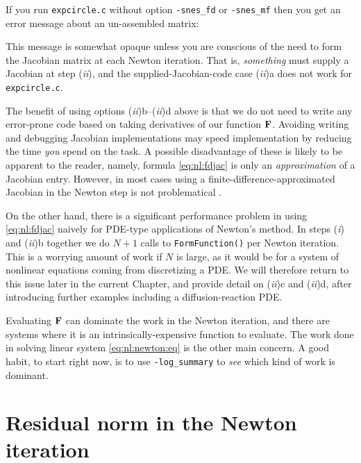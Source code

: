 If you run \texttt{expcircle.c} without option \texttt{-snes\_fd} or \texttt{-snes\_mf} then you get an error message about an un-assembled matrix:
This message is somewhat opaque unless you are conscious of the need to form the Jacobian matrix at each Newton iteration.  That is, \emph{something} must supply a Jacobian at step (\emph{ii}), and the supplied-Jacobian-code case (\emph{ii})a does not work for \texttt{expcircle.c}.

The benefit of using options (\emph{ii})b--(\emph{ii})d above is that we do not need to write any error-prone code based on taking derivatives of our function $\mathbf{F}$.  Avoiding writing and debugging Jacobian implementations may speed implementation by reducing the time \emph{you} spend on the task.  A possible disadvantage of these is likely to be apparent to the reader, namely, formula \eqref{eq:nl:fdjac} is only an \emph{approximation} of a Jacobian entry.  However, in most cases using a finite-difference-approximated Jacobian in the Newton step is not problematical \citep{Kelley2003}.

On the other hand, there is a significant performance problem in using \eqref{eq:nl:fdjac} naively for PDE-type applications of Newton's method.  In steps (\emph{i}) and (\emph{ii})b together we do $N+1$ calls to \texttt{FormFunction()} per Newton iteration.  This is a worrying amount of work if $N$ is large, as it would be for a system of nonlinear equations coming from discretizing a PDE.  We will therefore return to this issue later in the current Chapter, and provide detail on (\emph{ii})c and (\emph{ii})d, after introducing further examples including a diffusion-reaction PDE.

Evaluating $\mathbf{F}$ can dominate the work in the Newton iteration, and there are systems where it is an intrinsically-expensive function to evaluate.  The work done in solving linear system \eqref{eq:nl:newton:eq} is the other main concern.  A good \PETSc habit, to start right now, is to use \texttt{-log\_summary} to \emph{see} which kind of work is dominant.


\section{Residual norm in the Newton iteration}

